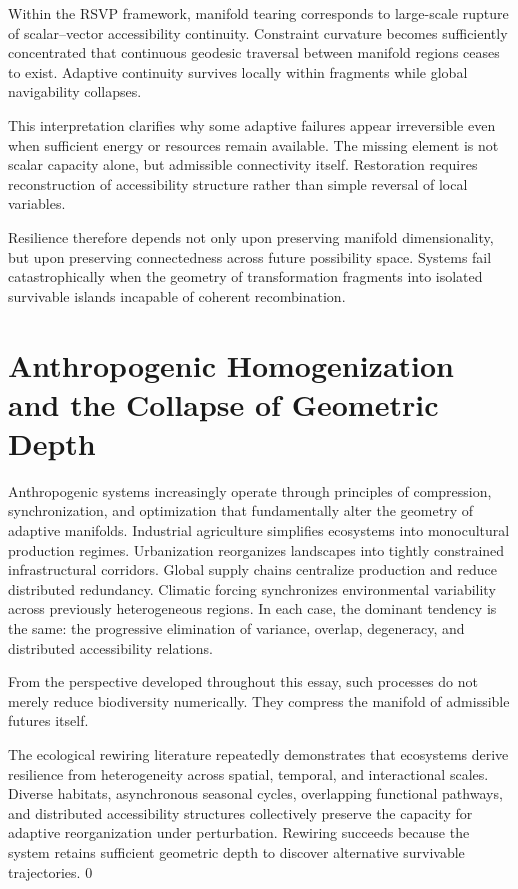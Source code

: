 \documentclass[11pt,a4paper]{article}
\begin{document}
Within the RSVP framework, manifold tearing corresponds to large-scale rupture of scalar--vector accessibility continuity. Constraint curvature becomes sufficiently concentrated that continuous geodesic traversal between manifold regions ceases to exist. Adaptive continuity survives locally within fragments while global navigability collapses.

This interpretation clarifies why some adaptive failures appear irreversible even when sufficient energy or resources remain available. The missing element is not scalar capacity alone, but admissible connectivity itself. Restoration requires reconstruction of accessibility structure rather than simple reversal of local variables.

Resilience therefore depends not only upon preserving manifold dimensionality, but upon preserving connectedness across future possibility space. Systems fail catastrophically when the geometry of transformation fragments into isolated survivable islands incapable of coherent recombination.


\newpage

\section{Anthropogenic Homogenization and the Collapse of Geometric Depth}

Anthropogenic systems increasingly operate through principles of compression, synchronization, and optimization that fundamentally alter the geometry of adaptive manifolds. Industrial agriculture simplifies ecosystems into monocultural production regimes. Urbanization reorganizes landscapes into tightly constrained infrastructural corridors. Global supply chains centralize production and reduce distributed redundancy. Climatic forcing synchronizes environmental variability across previously heterogeneous regions. In each case, the dominant tendency is the same: the progressive elimination of variance, overlap, degeneracy, and distributed accessibility relations.

From the perspective developed throughout this essay, such processes do not merely reduce biodiversity numerically. They compress the manifold of admissible futures itself.

The ecological rewiring literature repeatedly demonstrates that ecosystems derive resilience from heterogeneity across spatial, temporal, and interactional scales. Diverse habitats, asynchronous seasonal cycles, overlapping functional pathways, and distributed accessibility structures collectively preserve the capacity for adaptive reorganization under perturbation. Rewiring succeeds because the system retains sufficient geometric depth to discover alternative survivable trajectories. 0
\end{document}
